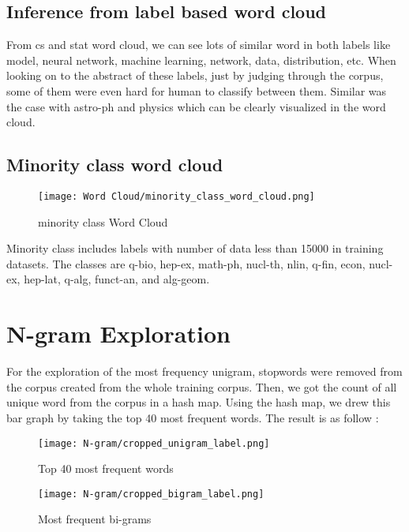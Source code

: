\subsection{Inference from label based word cloud}
From cs and stat word cloud, we can see lots of similar word in both labels like model, neural network, machine learning, network, data, distribution, etc. When looking on to the abstract of these labels, just by judging through the corpus, some of them were even hard for human to classify between them. Similar was the case with astro-ph and  physics which can be clearly visualized in the word cloud.

\subsection{Minority class word cloud}
\begin{figure}[H]
    \centering
    \texttt{[image: Word Cloud/minority\_class\_word\_cloud.png]}
    \caption{minority class Word Cloud}
    \label{fig:minority class Corpus Word Cloud}
\end{figure}

Minority class includes labels with number of data less than 15000 in training datasets. The classes are q-bio, hep-ex,
math-ph, nucl-th, nlin, q-fin, econ, nucl-ex, hep-lat, q-alg, funct-an,
and alg-geom.

\section{N-gram Exploration}
For the exploration of the most frequency unigram, stopwords were removed from the corpus created from the whole training corpus. Then, we got the count of all unique word from the corpus in a hash map. Using the hash map, we drew this bar graph by taking the top 40 most frequent words. The result is as follow :

\begin{figure}[H]
    \centering
    \texttt{[image: N-gram/cropped\_unigram\_label.png]}
    \caption{Top 40 most frequent words}
    \label{fig:Top 40 most frequent words}
\end{figure}


\begin{figure}[H]
    \centering
    \texttt{[image: N-gram/cropped\_bigram\_label.png]}
    \caption{Most frequent bi-grams}
    \label{fig:Most frequent bi-grams}
\end{figure}

